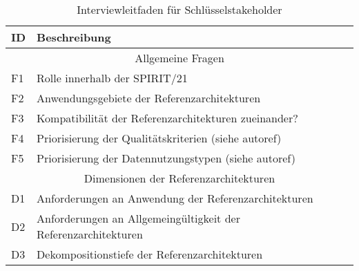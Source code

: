 \begin{table}[H]
\centering
\begin{tabular}{|l|l|}
\hline
ID & Beschreibung \\ \hline
\multicolumn{2}{|c|}{\cellcolor[HTML]{ECF4FF}Allgemeine Fragen} \\ \hline
F1 & Rolle innerhalb der SPIRIT/21 \\ \hline
F2 & Anwendungsgebiete der Referenzarchitekturen \\ \hline
F3 & Kompatibilität der Referenzarchitekturen zueinander? \\ \hline
F4 & Priorisierung der Qualitätskriterien (siehe autoref) \\ \hline
F5 & Priorisierung der Datennutzungstypen (siehe autoref) \\ \hline
\multicolumn{2}{|c|}{\cellcolor[HTML]{ECF4FF}Dimensionen der Referenzarchitekturen} \\ \hline
D1 & Anforderungen an Anwendung der Referenzarchitekturen \\ \hline
D2 & Anforderungen an Allgemeingültigkeit der Referenzarchitekturen \\ \hline
D3 & Dekompositionstiefe der Referenzarchitekturen \\ \hline
\end{tabular}
\caption{Interviewleitfaden für Schlüsselstakeholder}
\label{tab:intervieleitfaden}
\end{table}


